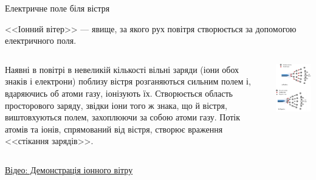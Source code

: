 \documentclass[onlytextwidth]{beamer}
\begin{document}
\begin{frame}{Електричне поле біля вістря}{}
\begin{onlyenv}
\begin{block}{}
			<<Іонний вітер>> --- явище, за якого рух повітря створюється за допомогою
			електричного поля.
		\end{block}
		\begin{columns}
			\begin{column}{0.6\linewidth}
				\begin{block}{}\justifying
					Наявні в повітрі в невеликій кількості вільні заряди (іони обох знаків і електрони)
					поблизу вістря розганяються сильним полем і, вдаряючись об атоми газу, іонізують
					їх. Створюється область просторового заряду, звідки іони того ж знака, що й вістря,
					виштовхуються полем, захоплюючи за собою атоми газу. Потік атомів та іонів,
					спрямований від вістря, створює враження <<стікання зарядів>>.
				\end{block}
			\end{column}
			\begin{column}{0.4\linewidth}\centering
				\includegraphics[width=0.9\linewidth]{ion_wind}
			\end{column}
		\end{columns}
		\begin{block}{}
			\href{https://www.youtube.com/watch?v=LNobNwDX2jQ}{Відео: Демонстрація іонного вітру}
		\end{block}
	\end{onlyenv}
\end{frame}
\end{document}
